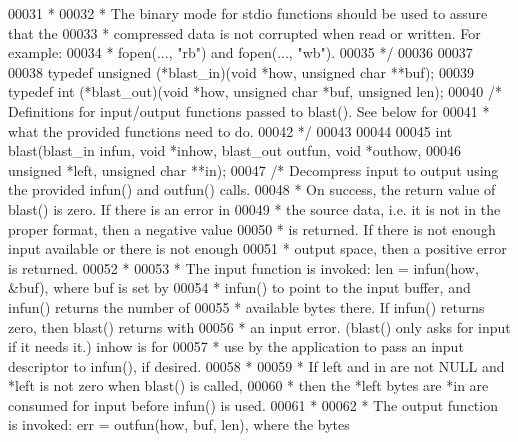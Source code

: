 \begin{DoxyCode}
00031 \textcolor{comment}{ *}
00032 \textcolor{comment}{ * The binary mode for stdio functions should be used to assure that the}
00033 \textcolor{comment}{ * compressed data is not corrupted when read or written.  For example:}
00034 \textcolor{comment}{ * fopen(..., "rb") and fopen(..., "wb").}
00035 \textcolor{comment}{ */}
00036 
00037 
00038 \textcolor{keyword}{typedef} unsigned (*blast\_in)(\textcolor{keywordtype}{void} *how, \textcolor{keywordtype}{unsigned} \textcolor{keywordtype}{char} **buf);
00039 \textcolor{keyword}{typedef} int (*blast\_out)(\textcolor{keywordtype}{void} *how, \textcolor{keywordtype}{unsigned} \textcolor{keywordtype}{char} *buf, \textcolor{keywordtype}{unsigned} len);
00040 \textcolor{comment}{/* Definitions for input/output functions passed to blast().  See below for}
00041 \textcolor{comment}{ * what the provided functions need to do.}
00042 \textcolor{comment}{ */}
00043 
00044 
00045 \textcolor{keywordtype}{int} blast(blast\_in infun, \textcolor{keywordtype}{void} *inhow, blast\_out outfun, \textcolor{keywordtype}{void} *outhow,
00046           \textcolor{keywordtype}{unsigned} *left, \textcolor{keywordtype}{unsigned} \textcolor{keywordtype}{char} **in);
00047 \textcolor{comment}{/* Decompress input to output using the provided infun() and outfun() calls.}
00048 \textcolor{comment}{ * On success, the return value of blast() is zero.  If there is an error in}
00049 \textcolor{comment}{ * the source data, i.e. it is not in the proper format, then a negative value}
00050 \textcolor{comment}{ * is returned.  If there is not enough input available or there is not enough}
00051 \textcolor{comment}{ * output space, then a positive error is returned.}
00052 \textcolor{comment}{ *}
00053 \textcolor{comment}{ * The input function is invoked: len = infun(how, &buf), where buf is set by}
00054 \textcolor{comment}{ * infun() to point to the input buffer, and infun() returns the number of}
00055 \textcolor{comment}{ * available bytes there.  If infun() returns zero, then blast() returns with}
00056 \textcolor{comment}{ * an input error.  (blast() only asks for input if it needs it.)  inhow is for}
00057 \textcolor{comment}{ * use by the application to pass an input descriptor to infun(), if desired.}
00058 \textcolor{comment}{ *}
00059 \textcolor{comment}{ * If left and in are not NULL and *left is not zero when blast() is called,}
00060 \textcolor{comment}{ * then the *left bytes are *in are consumed for input before infun() is used.}
00061 \textcolor{comment}{ *}
00062 \textcolor{comment}{ * The output function is invoked: err = outfun(how, buf, len), where the bytes}

\end{DoxyCode}
